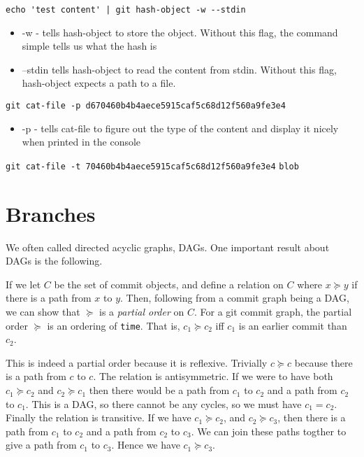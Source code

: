 \lstinline{echo 'test content' | git hash-object -w --stdin}

\begin{itemize}
\item -w - tells hash-object to store the object. Without this flag, 
the command simple tells us what the hash is
\item --stdin tells hash-object to read the content from stdin. Without this flag, 
hash-object expects a path to a file.
\end{itemize}


\lstinline{git cat-file -p d670460b4b4aece5915caf5c68d12f560a9fe3e4}

\begin{itemize}
\item -p - tells cat-file to figure out the type of the content and display 
it nicely when printed in the console
\end{itemize}

\lstinline{git cat-file -t 70460b4b4aece5915caf5c68d12f560a9fe3e4}
\lstinline{blob}

\section{Branches}


We often called directed acyclic graphs, DAGs. 
One important result about DAGs is the following. 


If we let $C$ be the set of commit objects, and define a relation on $C$ 
where $x \succeq y$ if there is a path from $x$ to $y$. Then, following 
from a commit graph being a DAG, we can show 
that $\succeq$ is a \textit{partial order} on $C$.
For a git commit graph, the partial order $\succeq$ is an ordering 
of \lstinline{time}. That is, $c_1 \succeq c_2$ iff $c_1$ is an earlier 
commit than $c_2$.

This is indeed a partial order because it is reflexive. 
Trivially $c \succeq c$ because there is a path from $c$ to $c$. 
The relation is antisymmetric. If we were to have both
$c_1 \succeq c_2$ and $c_2 \succeq c_1$ then there would be a 
path from $c_1$ to $c_2$ and a path from $c_2$ to $c_1$. 
This is a DAG, so there cannot be any cycles, so we must have $c_1 = c_2$.
Finally the relation is transitive. If we have $c_1 \succeq c_2$, and 
$c_2 \succeq c_3$, then there is a path from $c_1$ to $c_2$ and 
a path from $c_2$ to $c_3$. We can join these paths togther to give 
a path from $c_1$ to $c_3$. Hence we have $c_1 \succeq c_3$. 

